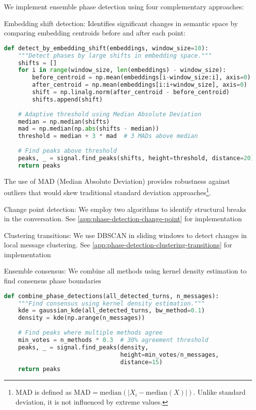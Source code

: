 \documentclass[11pt,letterpaper]{article}
\begin{document}
We implement ensemble phase detection using four complementary approaches:

Embedding shift detection: Identifies significant changes in semantic space by comparing embedding centroids before and after each point:

\begin{lstlisting}[language=Python]
def detect_by_embedding_shift(embeddings, window_size=10):
    """Detect phases by large shifts in embedding space."""
    shifts = []
    for i in range(window_size, len(embeddings) - window_size):
        before_centroid = np.mean(embeddings[i-window_size:i], axis=0)
        after_centroid = np.mean(embeddings[i:i+window_size], axis=0)
        shift = np.linalg.norm(after_centroid - before_centroid)
        shifts.append(shift)
    
    # Adaptive threshold using Median Absolute Deviation
    median = np.median(shifts)
    mad = np.median(np.abs(shifts - median))
    threshold = median + 3 * mad  # 3 MADs above median
    
    # Find peaks above threshold
    peaks, _ = signal.find_peaks(shifts, height=threshold, distance=20)
    return peaks
\end{lstlisting}

The use of MAD (Median Absolute Deviation) provides robustness against outliers that would skew traditional standard deviation approaches\footnote{MAD is defined as $\text{MAD} = \text{median}(|X_i - \text{median}(X)|)$. Unlike standard deviation, it is not influenced by extreme values.}.

Change point detection: We employ two algorithms to identify structural breaks in the conversation. See \ref{app:phase-detection-change-point} for implementation

Clustering transitions: We use DBSCAN in sliding windows to detect changes in local message clustering. See \ref{app:phase-detection-clustering-transitions} for implementation

Ensemble consensus: We combine all methods using kernel density estimation to find consensus phase boundaries

\begin{lstlisting}[language=Python]
def combine_phase_detections(all_detected_turns, n_messages):
    """Find consensus using kernel density estimation."""
    kde = gaussian_kde(all_detected_turns, bw_method=0.1)
    density = kde(np.arange(n_messages))
    
    # Find peaks where multiple methods agree
    min_votes = n_methods * 0.3  # 30% agreement threshold
    peaks, _ = signal.find_peaks(density, 
                                 height=min_votes/n_messages, 
                                 distance=15)
    return peaks
\end{lstlisting}
\end{document}
